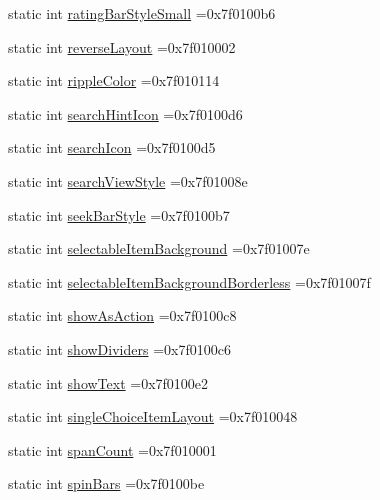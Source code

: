 \begin{DoxyCompactItemize}
\item 
static int \hyperlink{classandroid_1_1support_1_1v4_1_1R_1_1attr_a63f905da09e3e302af85eef728eceab0}{rating\+Bar\+Style\+Small} =0x7f0100b6
\item 
static int \hyperlink{classandroid_1_1support_1_1v4_1_1R_1_1attr_a368d5c0e08a4db3d61d03e203a69d00b}{reverse\+Layout} =0x7f010002
\item 
static int \hyperlink{classandroid_1_1support_1_1v4_1_1R_1_1attr_a883228f1bbc2373c6a179b2e8e914e61}{ripple\+Color} =0x7f010114
\item 
static int \hyperlink{classandroid_1_1support_1_1v4_1_1R_1_1attr_a4ee7e6e81237caeac9648d5b6ce2f5df}{search\+Hint\+Icon} =0x7f0100d6
\item 
static int \hyperlink{classandroid_1_1support_1_1v4_1_1R_1_1attr_ac9676ddfff5eaae3a4675c648675472f}{search\+Icon} =0x7f0100d5
\item 
static int \hyperlink{classandroid_1_1support_1_1v4_1_1R_1_1attr_a5814aa596bd1d0d9ca38992ec80a0507}{search\+View\+Style} =0x7f01008e
\item 
static int \hyperlink{classandroid_1_1support_1_1v4_1_1R_1_1attr_a1ad9bf745f8300ae35266d3f158e4ae1}{seek\+Bar\+Style} =0x7f0100b7
\item 
static int \hyperlink{classandroid_1_1support_1_1v4_1_1R_1_1attr_ad8f2ff9ffc480605ea9be198ddab859c}{selectable\+Item\+Background} =0x7f01007e
\item 
static int \hyperlink{classandroid_1_1support_1_1v4_1_1R_1_1attr_ab47b2c143ce4560a046c603de1045404}{selectable\+Item\+Background\+Borderless} =0x7f01007f
\item 
static int \hyperlink{classandroid_1_1support_1_1v4_1_1R_1_1attr_abcd33c251bf516613a4d29627aef5c27}{show\+As\+Action} =0x7f0100c8
\item 
static int \hyperlink{classandroid_1_1support_1_1v4_1_1R_1_1attr_aa53445a82594ef89d4797d7d7180f8d8}{show\+Dividers} =0x7f0100c6
\item 
static int \hyperlink{classandroid_1_1support_1_1v4_1_1R_1_1attr_aa0095b9dde80a1ef23701d9b393c5343}{show\+Text} =0x7f0100e2
\item 
static int \hyperlink{classandroid_1_1support_1_1v4_1_1R_1_1attr_a120fb3dc6f6858a1beef845f5ca49097}{single\+Choice\+Item\+Layout} =0x7f010048
\item 
static int \hyperlink{classandroid_1_1support_1_1v4_1_1R_1_1attr_a980e39a37ab6c8e47c77242914200735}{span\+Count} =0x7f010001
\item 
static int \hyperlink{classandroid_1_1support_1_1v4_1_1R_1_1attr_a5694b740c43f723768b3b198529ace85}{spin\+Bars} =0x7f0100be

\end{DoxyCompactItemize}
